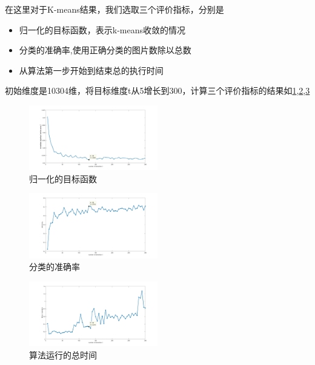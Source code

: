 \documentclass{ctexart}
\begin{document}
    在这里对于K-means结果，我们选取三个评价指标，分别是
    \begin{itemize}
    \item 归一化的目标函数，表示k-means收敛的情况
    \item 分类的准确率,使用正确分类的图片数除以总数
    \item 从算法第一步开始到结束总的执行时间
    \end{itemize}
    初始维度是10304维，将目标维度t从5增长到300，计算三个评价指标的结果如\ref{1},\ref{2},\ref{3} \\

        \begin{figure}[h]
        \centering
        \includegraphics[width=0.50\textwidth]{result/norm_F.jpg}
        \caption{归一化的目标函数}
        \label{1}
        \end{figure}

        \begin{figure}[h]
        \centering
        \includegraphics[width=0.50\textwidth]{result/acc.jpg}
        \caption{分类的准确率}
        \label{2}
        \end{figure}

        \begin{figure}[h]
        \centering
        \includegraphics[width=0.50\textwidth]{result/time_RP.jpg}
        \caption{算法运行的总时间}
        \label{3}
        \end{figure}
\end{document}
